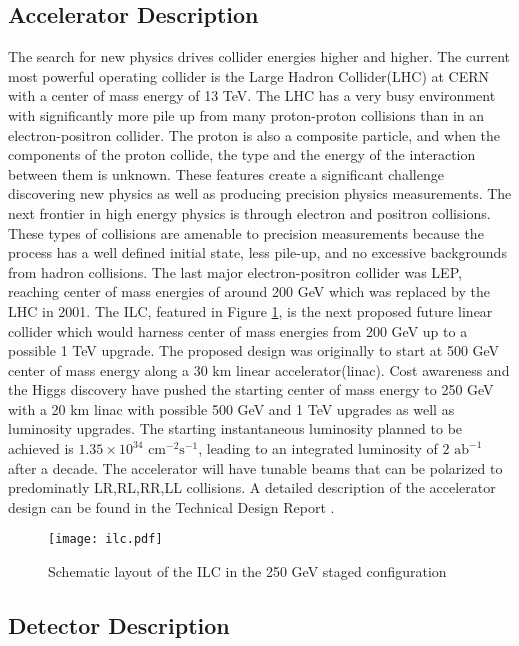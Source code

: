 \subsection{Accelerator Description}
\label{ilc}


The search for new physics drives collider energies higher and higher. The current most powerful operating collider is the Large Hadron Collider(LHC) at CERN with a center of mass energy of 13 TeV. The LHC has a very busy environment with significantly more pile up from many proton-proton collisions than in an electron-positron collider. The proton is also a composite particle, and when the components of the proton collide, the type and the energy of the interaction between them is unknown. These features create a significant challenge discovering new physics as well as producing precision physics measurements. The next frontier in high energy physics is through electron and positron collisions. These types of collisions are amenable to precision measurements because the process has a well defined initial state, less pile-up, and no excessive backgrounds from hadron collisions. The last major electron-positron collider was LEP, reaching center of mass energies of around 200 GeV which was replaced by the LHC in 2001.  The ILC, featured in Figure \ref{fig:ilc}, is the next proposed future linear collider which would harness center of mass energies from 200 GeV up to a possible 1 TeV upgrade.  The proposed design was originally to start at 500 GeV center of mass energy along a 30 km linear accelerator(linac). Cost awareness and the Higgs discovery have pushed the starting center of mass energy to 250 GeV  with a 20 km linac with possible 500 GeV and 1 TeV upgrades as well as luminosity upgrades.  The starting instantaneous luminosity planned to be achieved is $1.35 \times 10^{34} \, \, \text{cm}^{-2}\text{s}^{-1}$, leading to an integrated luminosity of $2 \, \, \text{ab}^{-1}$ after a decade. The accelerator will have tunable beams that can be polarized to predominatly LR,RL,RR,LL collisions.\cite{currdetector} A detailed description of the accelerator design can be found in the Technical Design Report \cite{tdraccel}.

\begin{figure}
\centering
\texttt{[image: ilc.pdf]}
\caption{Schematic layout of the ILC in the 250 GeV staged configuration \cite{currdetector} }
\label{fig:ilc}
\end{figure}

\subsection{Detector Description}
\label{ild}

